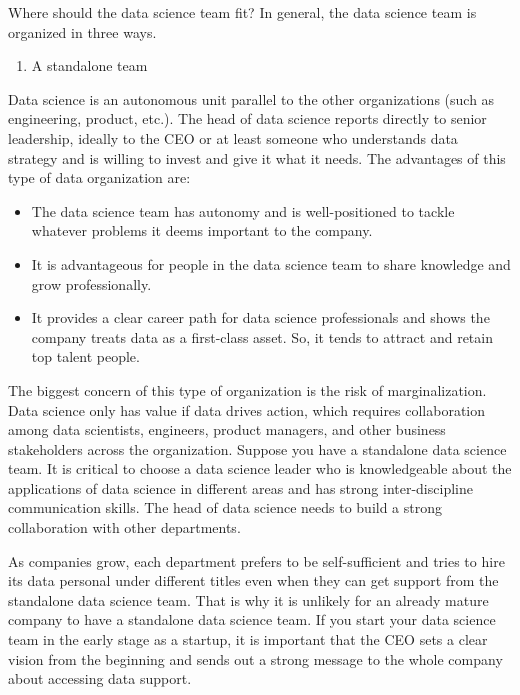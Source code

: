 \documentclass[12pt,]{krantz}
\providecommand{\tightlist}{%
  \setlength{\itemsep}{0pt}\setlength{\parskip}{0pt}}
\begin{document}
Where should the data science team fit? In general, the data science team is organized in three ways.

\begin{enumerate}
\def\labelenumi{(\arabic{enumi})}
\tightlist
\item
  A standalone team
\end{enumerate}

Data science is an autonomous unit parallel to the other organizations (such as engineering, product, etc.). The head of data science reports directly to senior leadership, ideally to the CEO or at least someone who understands data strategy and is willing to invest and give it what it needs. The advantages of this type of data organization are:

\begin{itemize}
\tightlist
\item
  The data science team has autonomy and is well-positioned to tackle whatever problems it deems important to the company.
\item
  It is advantageous for people in the data science team to share knowledge and grow professionally.
\item
  It provides a clear career path for data science professionals and shows the company treats data as a first-class asset. So, it tends to attract and retain top talent people.
\end{itemize}

The biggest concern of this type of organization is the risk of marginalization. Data science only has value if data drives action, which requires collaboration among data scientists, engineers, product managers, and other business stakeholders across the organization. Suppose you have a standalone data science team. It is critical to choose a data science leader who is knowledgeable about the applications of data science in different areas and has strong inter-discipline communication skills. The head of data science needs to build a strong collaboration with other departments.

As companies grow, each department prefers to be self-sufficient and tries to hire its data personal under different titles even when they can get support from the standalone data science team. That is why it is unlikely for an already mature company to have a standalone data science team. If you start your data science team in the early stage as a startup, it is important that the CEO sets a clear vision from the beginning and sends out a strong message to the whole company about accessing data support.
\end{document}
